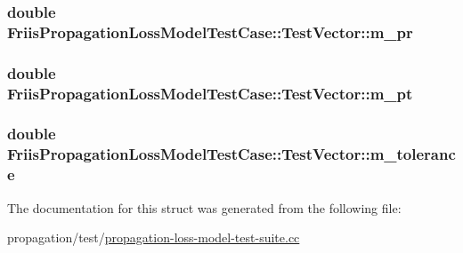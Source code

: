 \subsubsection[{\texorpdfstring{m\+\_\+pr}{m_pr}}]{\setlength{\rightskip}{0pt plus 5cm}double Friis\+Propagation\+Loss\+Model\+Test\+Case\+::\+Test\+Vector\+::m\+\_\+pr}\hypertarget{structFriisPropagationLossModelTestCase_1_1TestVector_a028b59fc414d1534943f2f31b6025ad2}{}\label{structFriisPropagationLossModelTestCase_1_1TestVector_a028b59fc414d1534943f2f31b6025ad2}
\subsubsection[{\texorpdfstring{m\+\_\+pt}{m_pt}}]{\setlength{\rightskip}{0pt plus 5cm}double Friis\+Propagation\+Loss\+Model\+Test\+Case\+::\+Test\+Vector\+::m\+\_\+pt}\hypertarget{structFriisPropagationLossModelTestCase_1_1TestVector_a792c206f5c0b31103ac43ff7e1f7870c}{}\label{structFriisPropagationLossModelTestCase_1_1TestVector_a792c206f5c0b31103ac43ff7e1f7870c}
\subsubsection[{\texorpdfstring{m\+\_\+tolerance}{m_tolerance}}]{\setlength{\rightskip}{0pt plus 5cm}double Friis\+Propagation\+Loss\+Model\+Test\+Case\+::\+Test\+Vector\+::m\+\_\+tolerance}\hypertarget{structFriisPropagationLossModelTestCase_1_1TestVector_a8f90758f5d9391091517d19fe1442fba}{}\label{structFriisPropagationLossModelTestCase_1_1TestVector_a8f90758f5d9391091517d19fe1442fba}


The documentation for this struct was generated from the following file\+:\begin{DoxyCompactItemize}
\item 
propagation/test/\hyperlink{propagation-loss-model-test-suite_8cc}{propagation-\/loss-\/model-\/test-\/suite.\+cc}\end{DoxyCompactItemize}
